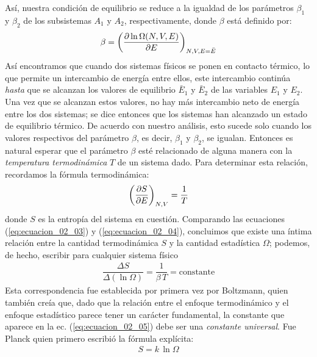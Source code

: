 Así, nuestra condición de equilibrio se reduce a la igualdad de los parámetros $\beta_{1}$ y $\beta_{2}$ de los subsistemas $A_{1}$ y $A_{2}$, respectivamente, donde $\beta$ está definido por:
\begin{align}
\beta = \left( \pdv{\ln \Omega (N, V, E)}{E} \right)_{N, V, E = \bar{E}}
\label{eq:ecuacion_02_03}
\end{align}
Así encontramos que cuando dos sistemas físicos se ponen en contacto térmico, lo que permite un intercambio de energía entre ellos, este intercambio continúa \emph{hasta} que se alcanzan los valores de equilibrio $\bar{E}_{1}$ y $\bar{E}_{2}$ de las variables $E_{1}$ y $E_{2}$. Una vez que se alcanzan estos valores, no hay más intercambio neto de energía entre los dos sistemas; se dice entonces que los sistemas han alcanzado un estado de equilibrio térmico. De acuerdo con nuestro análisis, esto sucede solo cuando los valores respectivos del parámetro $\beta$, es decir, $\beta_{1}$ y $\beta_{2}$, se igualan. Entonces es natural esperar que el parámetro $\beta$ esté relacionado de alguna manera con la \emph{temperatura termodinámica} $T$ de un sistema dado. Para determinar esta relación, recordamos la fórmula termodinámica:
\begin{align}
\left( \pdv{S}{E} \right)_{N, V} = \dfrac{1}{T}
\label{eq:ecuacion_02_04}
\end{align}
donde $S$ es la entropía del sistema en cuestión. Comparando las ecuaciones (\ref{eq:ecuacion_02_03}) y (\ref{eq:ecuacion_02_04}), concluimos que existe una íntima relación entre la cantidad termodinámica $S$ y la cantidad estadística $\Omega$; podemos, de hecho, escribir para cualquier sistema físico
\begin{align}
\dfrac{\Delta S}{\Delta (\ln \Omega)} = \dfrac{1}{\beta \, T} = \text{constante}
\label{eq:ecuacion_02_05} 
\end{align}
Esta correspondencia fue establecida por primera vez por Boltzmann, quien también creía que, dado que la relación entre el enfoque termodinámico y el enfoque estadístico parece tener un carácter fundamental, la constante que aparece en la ec. (\ref{eq:ecuacion_02_05}) debe ser una \emph{constante universal}. Fue Planck quien primero escribió la fórmula explícita:
\begin{align}
S = k \, \ln \Omega
\label{eq:ecuacion_02_06}
\end{align}

